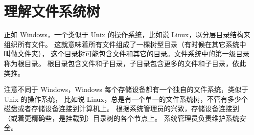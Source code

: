 \section{理解文件系统树} %
\label{sec:理解文件系统树}

正如 Windows，一个类似于 Unix 的操作系统，比如说 Linux，以分层目录结构来组织所有文件。 这就意味着所有文件组成了一棵树型目录（有时候在其它系统中叫做文件夹）， 这个目录树可能包含文件和其它的目录。文件系统中的第一级目录称为根目录。 根目录包含文件和子目录，子目录包含更多的文件和子目录，依此类推。

\par 注意不同于 Windows，Windows 每个存储设备都有一个独自的文件系统，类似于 Unix 的操作系统， 比如说 Linux，总是有一个单一的文件系统树，不管有多少个磁盘或者存储设备连接到计算机上。 根据系统管理员的兴致，存储设备连接到（或着更精确些，是挂载到）目录树的各个节点上。 系统管理员负责维护系统安全。


